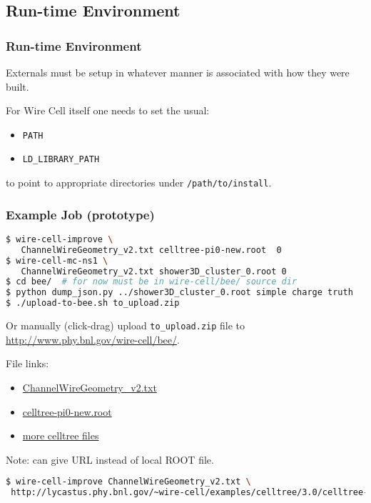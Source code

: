 \documentclass[xcolor=dvipsnames]{beamer}
\begin{document}
\subsection{Run-time Environment}

\begin{frame}[fragile]
  \frametitle{Run-time Environment}

  Externals must be setup in whatever manner is associated with how they were built.

  For Wire Cell itself one needs to set the usual:

  \begin{itemize}
  \item \verb|PATH|
  \item \verb|LD_LIBRARY_PATH|
  \end{itemize}

  to point to appropriate directories under \verb|/path/to/install|.

\end{frame}

\begin{frame}[fragile]
  \frametitle{Example Job (prototype)}
\begin{lstlisting}[language=sh]
$ wire-cell-improve \
   ChannelWireGeometry_v2.txt celltree-pi0-new.root  0
$ wire-cell-mc-ns1 \
   ChannelWireGeometry_v2.txt shower3D_cluster_0.root 0
$ cd bee/  # for now must be in wire-cell/bee/ source dir
$ python dump_json.py ../shower3D_cluster_0.root simple charge truth
$ ./upload-to-bee.sh to_upload.zip 
\end{lstlisting}

Or manually (click-drag) upload \texttt{to\_upload.zip} file to \url{http://www.phy.bnl.gov/wire-cell/bee/}.

  File links:
  \begin{itemize}
  \item \href{https://raw.githubusercontent.com/BNLIF/wire-cell-celltree/master/geometry/ChannelWireGeometry_v2.txt}{ChannelWireGeometry\_v2.txt}
  \item \href{http://lycastus.phy.bnl.gov/~wire-cell/examples/celltree/3.0/celltree-pi0-new.root}{celltree-pi0-new.root}
  \item \href{http://lycastus.phy.bnl.gov/~wire-cell/examples/celltree/}{more celltree files}
  \end{itemize}
  Note: can give URL instead of local ROOT file.

  \begin{lstlisting}[language=sh,basicstyle=\tiny]
$ wire-cell-improve ChannelWireGeometry_v2.txt \
 http://lycastus.phy.bnl.gov/~wire-cell/examples/celltree/3.0/celltree-pi0-new.root 0
  \end{lstlisting}
\end{frame}
\end{document}
